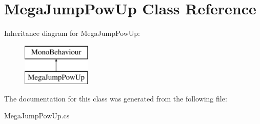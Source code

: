 \hypertarget{class_mega_jump_pow_up}{}\section{Mega\+Jump\+Pow\+Up Class Reference}
\label{class_mega_jump_pow_up}
Inheritance diagram for Mega\+Jump\+Pow\+Up\+:\begin{figure}[H]
\begin{center}
\leavevmode
\includegraphics[height=2.000000cm]{class_mega_jump_pow_up}
\end{center}
\end{figure}


The documentation for this class was generated from the following file\+:\begin{DoxyCompactItemize}
\item 
Mega\+Jump\+Pow\+Up.\+cs\end{DoxyCompactItemize}
